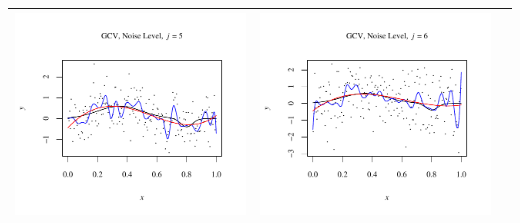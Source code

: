 \documentclass[11pt]{article}
\begin{document}
\begin{table}[h!]
\begin{center}
\begin{tabular}{| >{\centering\arraybackslash}m{2.1in} |  >{\centering\arraybackslash}m{2.1in} |  >{\centering\arraybackslash}m{2.1in}|}
      \includegraphics[width=1\linewidth,height=0.18\textheight]{Graphs/2/1/assignment5_a_2_1_5}&
      \includegraphics[width=1\linewidth,height=0.18\textheight]{Graphs/2/1/assignment5_a_2_1_6}\\\hline
    \end{tabular}
  \end{center}
\end{table}
\end{document}
